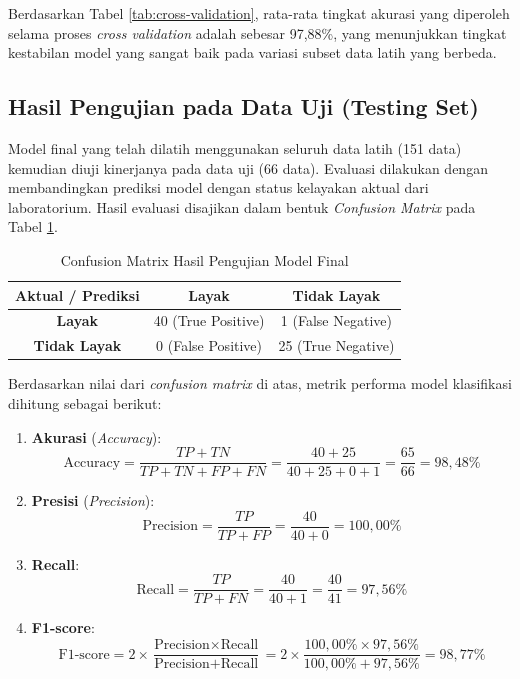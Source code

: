 Berdasarkan Tabel \ref{tab:cross-validation}, rata-rata tingkat akurasi yang diperoleh selama proses \textit{cross validation} adalah sebesar 97,88\%, yang menunjukkan tingkat kestabilan model yang sangat baik pada variasi subset data latih yang berbeda.

\subsection{Hasil Pengujian pada Data Uji (Testing Set)}
Model final yang telah dilatih menggunakan seluruh data latih (151 data) kemudian diuji kinerjanya pada data uji (66 data). Evaluasi dilakukan dengan membandingkan prediksi model dengan status kelayakan aktual dari laboratorium. Hasil evaluasi disajikan dalam bentuk \textit{Confusion Matrix} pada Tabel \ref{tab:conf-matrix-result}.

\begin{table}[htbp]
    \centering
    \caption{Confusion Matrix Hasil Pengujian Model Final}
    \label{tab:conf-matrix-result}
    \fontsize{10pt}{12pt}\selectfont
    \begin{tabular}{|c|c|c|}
        \hline
        \textbf{Aktual / Prediksi} & \textbf{Layak} & \textbf{Tidak Layak} \\
        \hline
        \textbf{Layak} & 40 (True Positive) & 1 (False Negative) \\
        \hline
        \textbf{Tidak Layak} & 0 (False Positive) & 25 (True Negative) \\
        \hline
    \end{tabular}
\end{table}

Berdasarkan nilai dari \textit{confusion matrix} di atas, metrik performa model klasifikasi dihitung sebagai berikut:
\begin{enumerate}
    \item \textbf{Akurasi} (\textit{Accuracy}):
    \begin{equation}
        \text{Accuracy} = \frac{TP + TN}{TP + TN + FP + FN} = \frac{40 + 25}{40 + 25 + 0 + 1} = \frac{65}{66} = 98,48\%
    \end{equation}
    \item \textbf{Presisi} (\textit{Precision}):
    \begin{equation}
        \text{Precision} = \frac{TP}{TP + FP} = \frac{40}{40 + 0} = 100,00\%
    \end{equation}
    \item \textbf{Recall}:
    \begin{equation}
        \text{Recall} = \frac{TP}{TP + FN} = \frac{40}{40 + 1} = \frac{40}{41} = 97,56\%
    \end{equation}
    \item \textbf{F1-score}:
    \begin{equation}
        \text{F1-score} = 2 \times \frac{\text{Precision} \times \text{Recall}}{\text{Precision} + \text{Recall}} = 2 \times \frac{100,00\% \times 97,56\%}{100,00\% + 97,56\%} = 98,77\%
    \end{equation}
\end{enumerate}

